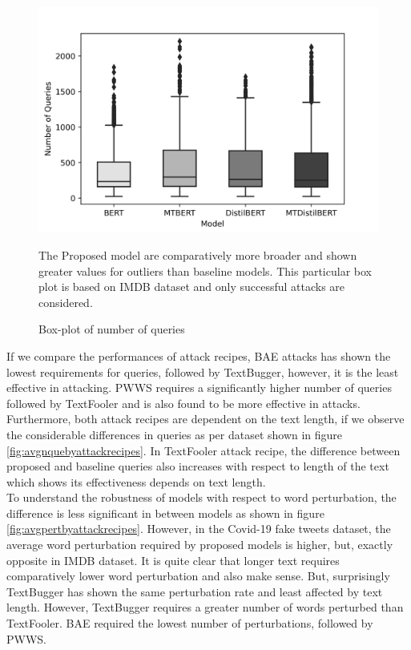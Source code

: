 \documentclass[%
	BCOR=8mm, %
	DIV=12,
	toc=bibliography, %
	toc=listof, %
	oneside, %
	egregdoesnotlikesansseriftitles, %
	]{scrbook}
\begin{document}
\begin{figure}[H]
    \centering
    \includegraphics[width=0.7\linewidth]{img/NumQueriesDist_IMDB.png}
    \caption{Box-plot of number of queries}{ The Proposed model are comparatively more broader and shown greater values for outliers than baseline models. This particular box plot is based on IMDB dataset and only successful attacks are considered.}
    \label{fig:numofqueriesdist}
\end{figure}
If we compare the performances of attack recipes, BAE attacks has shown the lowest requirements for queries, followed by TextBugger, however, it is the least effective in attacking. PWWS requires a significantly higher number of queries followed by TextFooler and is also found to be more effective in attacks. Furthermore, both attack recipes are dependent on the text length, if we observe the considerable differences in queries as per dataset shown in figure \ref{fig:avgnquebyattackrecipes}. In TextFooler attack recipe, the difference between proposed and baseline queries also increases with respect to length of the text which shows its effectiveness depends on text length. \\
To understand the robustness of models with respect to word perturbation, the difference is less significant in between models as shown in figure \ref{fig:avgpertbyattackrecipes}. However, in the Covid-19 fake tweets dataset, the average word perturbation required by proposed models is higher, but, exactly opposite in IMDB dataset. It is quite clear that longer text requires comparatively lower word perturbation and also make sense. But, surprisingly TextBugger has shown the same perturbation rate and least affected by text length. However,  TextBugger requires a greater number of words perturbed than TextFooler. BAE required the lowest number of perturbations, followed by PWWS.
\end{document}
